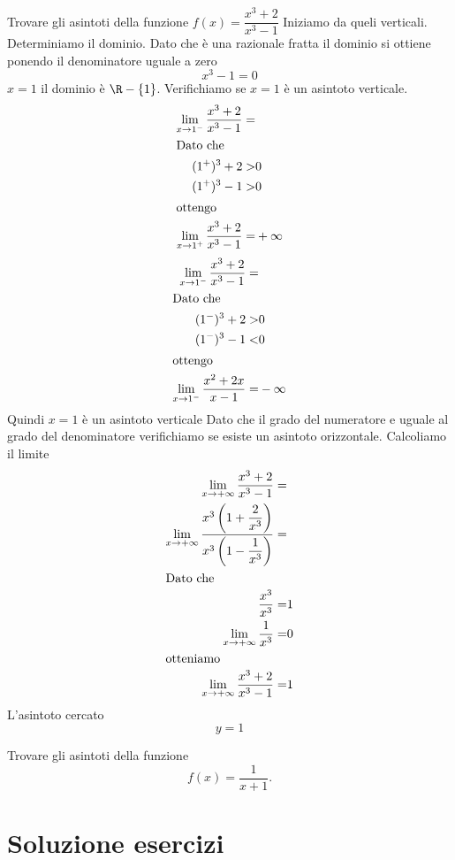 \begin{exercise}
	Trovare gli asintoti della funzione $f(x)=\dfrac{x^3+2}{x^3-1}$
	\tcblower
	Iniziamo da queli verticali. Determiniamo il dominio. Dato che è una razionale fratta il dominio si ottiene ponendo il denominatore uguale a zero\[x^3-1=0\] $x=1$ il dominio è $\R-\lbrace1\rbrace$. Verifichiamo se $x=1$ è un asintoto verticale.
	\begin{align*}
	\lim_{x\to 1^-}\dfrac{x^3+2}{x^3-1}=&\\
	\intertext{Dato che}
	(1^+)^3+2>&0\\
	(1^+)^3-1>&0\\
	\intertext{ottengo}
	\lim_{x\to 1^+}\dfrac{x^3+2}{x^3-1}=&+\infty\\
	\end{align*}
	\begin{align*}
	\lim_{x\to 1^-}\dfrac{x^3+2}{x^3-1}=&\\
		\intertext{Dato che}
	(1^-)^3+2>&0\\
	(1^-)^3-1<&0\\
	\intertext{ottengo}
	\lim_{x\to 1^-}\dfrac{x^2+2x}{x-1}=&-\infty\\
	\end{align*}
	Quindi $x=1$ è un asintoto verticale
	Dato che il grado del numeratore e uguale al grado del denominatore verifichiamo se esiste un asintoto orizzontale. Calcoliamo il limite
	\begin{align*}
	\lim_{x\to +\infty}\dfrac{x^3+2}{x^3-1}=&\\
	\lim_{x\to +\infty}\dfrac{x^3\left(1+\dfrac{2}{x^3}\right)}{x^3\left(1-\dfrac{1}{x^3}\right)}=&\\
	\intertext{Dato che}
	\dfrac{x^3}{x^3}=&1\\
	\lim_{x\to +\infty}\dfrac{1}{x^3}=&0\\
	\intertext{otteniamo}
	\lim_{x\to +\infty}\dfrac{x^3+2}{x^3-1}=&1\\
	\end{align*}
	L'asintoto cercato\[y=1\]
\end{exercise}
\begin{exercise}[no solution]
	Trovare gli asintoti della funzione
	\begin{equation*}
	f(x)=\dfrac{1}{x+1}.
	\end{equation*}
\end{exercise}
\tcbstoprecording
\newpage
\section{Soluzione esercizi}
\tcbinputrecords
